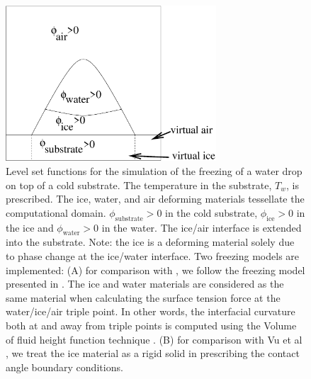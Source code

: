 \documentclass[]{article}
\begin{document}
\begin{figure}[htbp]
  \centering
    \includegraphics[width=0.7\textwidth]{ice_levelset.eps}
        \caption{Level set functions for the simulation of 
	the freezing of a water drop on top of a cold substrate.
	The temperature in the substrate, $T_{w}$, is prescribed.
        The ice, water, and air deforming materials tessellate
        the computational domain.
        $\phi_{\mbox{substrate}}>0$ in the cold substrate,
        $\phi_{\mbox{ice}}>0$ in the ice and 
        $\phi_{\mbox{water}}>0$ in the water.  The
        ice/air interface is extended into the substrate.
        Note: the ice is a deforming material solely due to 
        phase change at the ice/water interface.
	Two freezing models are implemented: (A) for comparison with
        \cite{hu2010icing}, we follow the 
        freezing model presented in \cite{lyu2021hybrid}. The
        ice and water materials are considered as the same
        material when calculating the surface tension force 
        at the water/ice/air triple point.
        In other words, the interfacial
        curvature both at and away from triple points is computed using
        the Volume of fluid height function technique
	\cite{sussman2003second}.  (B) for comparison with Vu et al
	\cite{vu2013front}, we treat the ice material as a rigid solid in 
	prescribing the contact angle boundary conditions.
    }
  \label{ice_levelset}
\end{figure}
\end{document}
